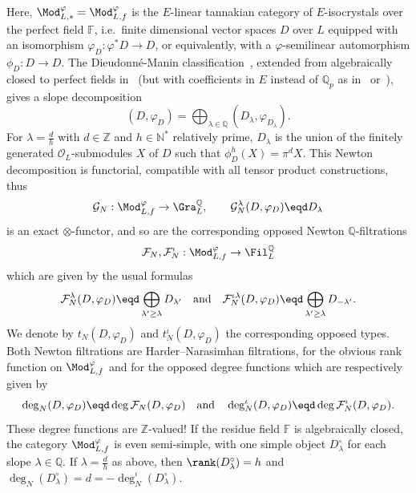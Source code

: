 Here, $\Mod_{L,\ast}^{\varphi}=\Mod_{L,f}^{\varphi}$ is the $E$-linear tannakian category of $E$-isocrystals over the perfect field $\mathbb{F}$, i.e.~finite dimensional vector spaces $D$ over $L$ equipped with an isomorphism $\varphi_{D}:\varphi^{\ast}D\rightarrow D$, or equivalently, with a $\varphi$-semilinear automorphism $\phi_{D}:D\rightarrow D$. The Dieudonn\'e-Manin classification~\cite{Ma63,De86}, extended from algebraically closed to perfect fields in~\cite{Zi84} (but with coefficients in $E$ instead of $\mathbb{Q}_{p}$ as in~\cite{Ko85} or~\cite{FaFo15}), gives a slope decomposition~\cite[VIII \S 1]{DaOrRa10}
\[
(D,\varphi_{D})=\bigoplus_{\lambda\in\mathbb{Q}}(D_{\lambda},\varphi_{D_{\lambda}}).
\]
For $\lambda=\frac{d}{h}$ with $d\in\mathbb{Z}$ and $h\in\mathbb{N}^{\ast}$ relatively prime, $D_{\lambda}$ is the union of the finitely generated $\mathcal{O}_{L}$-submodules $X$ of $D$ such that $\phi_{D}^{h}(X)=\pi^{d}X$. This Newton decomposition is functorial, compatible with all tensor product constructions, thus
\[
\mathcal{G}_{N}:\Mod_{L,f}^{\varphi}\rightarrow\Gra_{L}^{\mathbb{Q}},\qquad\mathcal{G}_{N}^{\lambda}(D,\varphi_{D})\eqd D_{\lambda}
\]
is an exact $\otimes$-functor, and so are the corresponding opposed Newton $\mathbb{Q}$-filtrations
\[
\mathcal{F}_{N},\mathcal{F}_{N}^{\iota}:\Mod_{L,f}^{\varphi}\rightarrow\Fil_{L}^{\mathbb{Q}}
\]
which are given by the usual formulas
\[
\mathcal{F}_{N}^{\lambda}(D,\varphi_{D})\eqd\bigoplus_{\lambda^{\prime}\geq\lambda}D_{\lambda^{\prime}}\quad\text{and}\quad\mathcal{F}_{N}^{\iota\lambda}(D,\varphi_{D})\eqd\bigoplus_{\lambda^{\prime}\geq\lambda}D_{-\lambda^{\prime}}.
\]
We denote by $t_{N}(D,\varphi_{D})$ and $t_{N}^{\iota}(D,\varphi_{D})$ the corresponding opposed types. Both Newton filtrations are Harder--Narasimhan filtrations, for the obvious rank function on $\Mod_{L,f}^{\varphi}$ and for the opposed degree functions which are respectively given by
\[
\deg_{N}(D,\varphi_{D})\eqd\deg\mathcal{F}_{N}(D,\varphi_{D})\quad\text{and}\quad\deg_{N}^{\iota}(D,\varphi_{D})\eqd\deg\mathcal{F}_{N}^{\iota}(D,\varphi_{D}).
\]
These degree functions are $\mathbb{Z}$-valued! If the residue field $\mathbb{F}$ is algebraically closed, the category $\Mod_{L,f}^{\varphi}$ is even semi-simple, with one simple object $D_{\lambda}^{\circ}$ for each slope $\lambda\in\mathbb{Q}$. If $\lambda=\frac{d}{h}$ as above, then $\rank(D_{\lambda}^{\circ})=h$ and $\deg_{N}(D_{\lambda}^{\circ})=d=-\deg_{N}^{\iota}(D_{\lambda}^{\circ})$.

